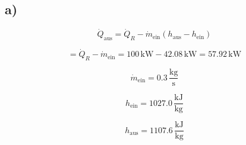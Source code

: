 

\subsection*{a)}

\[
\dot{Q}_{\text{aus}} = \dot{Q}_R - \dot{m}_{\text{ein}} (h_{\text{aus}} - h_{\text{ein}})
\]

\[
= \dot{Q}_R - \dot{m}_{\text{ein}} = 100 \, \text{kW} - 42.08 \, \text{kW} = 57.92 \, \text{kW}
\]

\[
\dot{m}_{\text{ein}} = 0.3 \, \frac{\text{kg}}{\text{s}}
\]

\[
h_{\text{ein}} = 1027.0 \, \frac{\text{kJ}}{\text{kg}}
\]

\[
h_{\text{aus}} = 1107.6 \, \frac{\text{kJ}}{\text{kg}}
\]